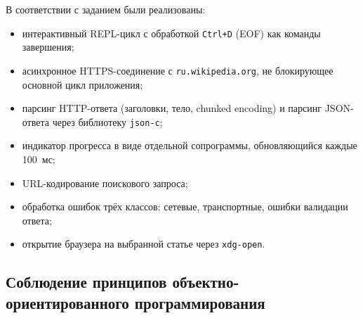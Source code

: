 \documentclass[12pt]{extarticle}
\begin{document}
В соответствии с заданием были реализованы:

\begin{itemize}
    \item интерактивный REPL-цикл с обработкой \texttt{Ctrl+D}
          (EOF) как команды завершения;
    \item асинхронное HTTPS-соединение с
          \texttt{ru.wikipedia.org}, не блокирующее основной
          цикл приложения;
    \item парсинг HTTP-ответа (заголовки, тело, chunked
          encoding) и парсинг JSON-ответа через библиотеку
          \texttt{json-c};
    \item индикатор прогресса в виде отдельной
          сопрограммы, обновляющийся каждые 100~мс;
    \item URL-кодирование поискового запроса;
    \item обработка ошибок трёх классов: сетевые, транспортные,
          ошибки валидации ответа;
    \item открытие браузера на выбранной статье через
          \texttt{xdg-open}.
\end{itemize}

\subsection*{Соблюдение принципов объектно-ориентированного
программирования}
\end{document}
